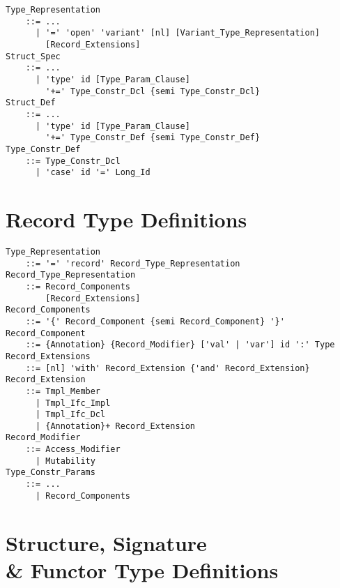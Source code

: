 \grammar\begin{lstlisting}
Type_Representation 
    ::= ...
      | '=' 'open' 'variant' [nl] [Variant_Type_Representation] 
        [Record_Extensions]
Struct_Spec
    ::= ...
      | 'type' id [Type_Param_Clause] 
        '+=' Type_Constr_Dcl {semi Type_Constr_Dcl}
Struct_Def
    ::= ...
      | 'type' id [Type_Param_Clause] 
        '+=' Type_Constr_Def {semi Type_Constr_Def}
Type_Constr_Def
    ::= Type_Constr_Dcl 
      | 'case' id '=' Long_Id
\end{lstlisting}






\section{Record Type Definitions}
\label{sec:record-types}

\grammar\begin{lstlisting}
Type_Representation 
    ::= '=' 'record' Record_Type_Representation
Record_Type_Representation 
    ::= Record_Components 
        [Record_Extensions]
Record_Components 
    ::= '{' Record_Component {semi Record_Component} '}'
Record_Component 
    ::= {Annotation} {Record_Modifier} ['val' | 'var'] id ':' Type
Record_Extensions 
    ::= [nl] 'with' Record_Extension {'and' Record_Extension}
Record_Extension 
    ::= Tmpl_Member
      | Tmpl_Ifc_Impl
      | Tmpl_Ifc_Dcl
      | {Annotation}+ Record_Extension
Record_Modifier 
    ::= Access_Modifier 
      | Mutability
Type_Constr_Params
    ::= ...
      | Record_Components
\end{lstlisting}





\section[Structure, Signature \& Functor Type Definitions]{Structure, Signature \\\& Functor Type Definitions}
\label{sec:struct-types}

